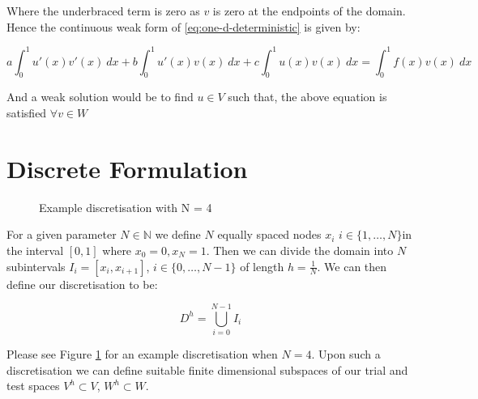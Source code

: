 Where the underbraced term is zero as $v$ is zero at the endpoints of the
domain. Hence the continuous weak form of \ref{eq:one-d-deterministic} is given
by:

\begin{equation}\label{eq:wk-oned-deterministic}
    a\int_0^1{u'(x)v'(x)\ dx} + b\int_0^1{u'(x)v(x)\ dx}
    + c\int_0^1{u(x)v(x)\ dx} = \int_0^1{f(x)v(x)\ dx}
\end{equation}

And a weak solution would be to find $u \in V$ such that, the above equation is
satisfied $\forall v \in W$

\section{Discrete Formulation}

\begin{figure}
\centering
{}
\caption{Example discretisation with N = 4}
\label{fig:one-d-discretisation}
\end{figure}

For a given parameter $N \in \mathbb{N}$ we define $N$ equally spaced nodes
$x_i$ $i \in \{1, \ldots, N\} $in the interval $[0,1]$ where
$x_0 = 0, x_N = 1$. Then we can divide the domain into $N$ subintervals
$ I_i = [x_i, x_{i+1}]$, $i \in \{0,\ldots,N - 1\}$ of length $h = \frac{1}{N}$.
We can then define our discretisation to be:

\[
    D^h = \bigcup_{i=0}^{N - 1} I_i
\]

Please see Figure \ref{fig:one-d-discretisation} for an example discretisation
when $N=4$.  Upon such a discretisation we can define suitable finite
dimensional subspaces of our trial and test spaces $V^h \subset V$, $W^h
\subset W$.


